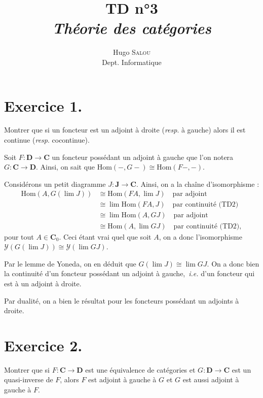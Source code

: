 \documentclass{../../td}
\title{TD n°3\\\itshape Théorie des catégories}
\author{Hugo \textsc{Salou}\\ Dept. Informatique}
\begin{document}
  \maketitle
  
  {
    \small
    \tableofcontents
  }


  \chapter{Exercice 1.}
  \begin{slshape}
    \color{deepblue}
    Montrer que si un foncteur est un adjoint à droite (\textit{resp}. à gauche) alors il est continue (\textit{resp}. cocontinue).
  \end{slshape}

  Soit $F : \mathbf{D} \to \mathbf{C}$ un foncteur possédant un adjoint à gauche que l'on notera $G : \mathbf{C} \to \mathbf{D}$.
  Ainsi, on sait que $\mathrm{Hom}(-, G-) \cong \mathrm{Hom}(F-,-)$.

  Considérons un petit diagramme $J : \mathbf{J} \to \mathbf{C}$.
  Ainsi, on a la chaîne d'isomorphisme :
  \begin{align*}
    \mathrm{Hom}(A, G(\lim J))
    &\cong \mathrm{Hom}(FA, \lim J) \quad \text{par adjoint}\\
    &\cong \lim \mathrm{Hom}(F A, J) \quad \text{par continuité (TD2)}\\
    &\cong \lim \mathrm{Hom}(A, GJ) \quad \text{par adjoint}\\
    &\cong \mathrm{Hom}(A, \lim GJ) \quad \text{par continuité (TD2)}
  ,\end{align*}
  pour tout $A \in \mathbf{C}_0$.
  Ceci étant vrai quel que soit $A$, on a donc l'isomorphisme $\mathcal{Y}(G(\lim J)) \cong \mathcal{Y}(\lim G J)$.

  Par le lemme de Yoneda, on en déduit que $G(\lim J) \cong \lim G J$.
  On a donc bien la continuité d'un foncteur possédant un adjoint à gauche,~\textit{i.e.} d'un foncteur qui est à un adjoint à droite.

  Par dualité, on a bien le résultat pour les foncteurs possédant un adjoints à droite.

  \chapter{Exercice 2.}
  \begin{slshape}
    \color{deepblue}
    Montrer que si $F : \mathbf{C} \to \mathbf{D}$ est une équivalence de catégories et $G : \mathbf{D} \to \mathbf{C}$ est un quasi-inverse de $F$, alors $F$ est adjoint à gauche à $G$ et $G$ est aussi adjoint à gauche à $F$.
  \end{slshape}
\end{document}
